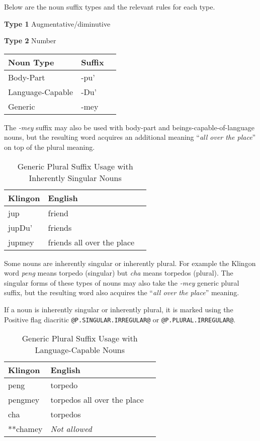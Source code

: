 \documentclass[11pt]{article}
\begin{document}
Below are the noun suffix types and the relevant rules for each type.

\textbf{Type 1} Augmentative/diminutive

\textbf{Type 2} Number

	\begin{center}
	\begin{tabular}{lll}
	\toprule
	\bf{Noun Type} & \bf{Suffix} \\
	\midrule
	Body-Part & -pu' \\
	Language-Capable & -Du' \\
	Generic & -mey \\
	\bottomrule
	\end{tabular}
	\end{center}

The \textit{-mey} suffix may also be used with body-part and beings-capable-of-language nouns, but the resulting word acquires an additional meaning ``\textit{all over the place}'' on top of the plural meaning.
	
	\begin{table}[h]
	\begin{center}
	\begin{tabular}{lll}
	\toprule
	\bf Klingon & \bf English \\
	\midrule
	jup & friend \\
	jupDu' & friends \\
	jupmey & friends all over the place \\
	\bottomrule
	\end{tabular}
	\end{center}
	\caption{Generic Plural Suffix Usage with Inherently Singular Nouns}
	\end{table}

Some nouns are inherently singular or inherently plural. For example the Klingon word \textit{peng} means torpedo (singular) but \textit{cha} means torpedos (plural). The singular forms of these types of nouns may also take the \textit{-mey} generic plural suffix, but the resulting word also acquires the ``\textit{all over the place}'' meaning.
	
If a noun is inherently singular or inherently plural, it is marked using the Positive flag diacritic \texttt{@P.SINGULAR.IRREGULAR@} or \texttt{@P.PLURAL.IRREGULAR@}.
	
	\begin{table}[h]
	\begin{center}
	\begin{tabular}{lll}
	\toprule
	\bf Klingon & \bf English \\
	\midrule
	peng & torpedo \\
	pengmey & torpedos all over the place \\
	cha & torpedos \\
	**chamey & \it Not allowed \\
	\bottomrule
	\end{tabular}
	\end{center}
	\caption{Generic Plural Suffix Usage with Language-Capable Nouns}
	\end{table}
\end{document}
